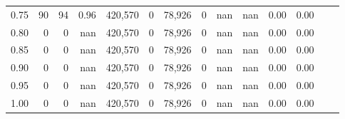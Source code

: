 \begin{tabular}{rrrrrrrrrrrrrr}
0.75 &      90 &      94 &    0.96 &  420,570 &        0 &  78,926 &       0 &   nan &   nan &  0.00 &      0.00 \\
0.80 &       0 &       0 &     nan &  420,570 &        0 &  78,926 &       0 &   nan &   nan &  0.00 &      0.00 \\
0.85 &       0 &       0 &     nan &  420,570 &        0 &  78,926 &       0 &   nan &   nan &  0.00 &      0.00 \\
0.90 &       0 &       0 &     nan &  420,570 &        0 &  78,926 &       0 &   nan &   nan &  0.00 &      0.00 \\
0.95 &       0 &       0 &     nan &  420,570 &        0 &  78,926 &       0 &   nan &   nan &  0.00 &      0.00 \\
1.00 &       0 &       0 &     nan &  420,570 &        0 &  78,926 &       0 &   nan &   nan &  0.00 &      0.00 \\
\bottomrule
\end{tabular}
